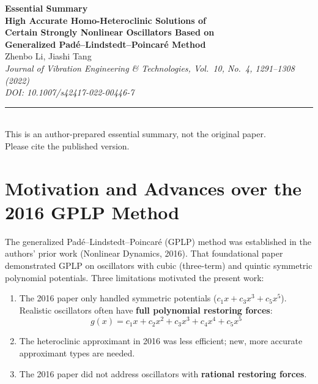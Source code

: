 \documentclass[11pt,a4paper]{article}
\begin{document}
\raggedbottom

\begin{center}
{\LARGE\bfseries\color{primary}Essential Summary}\\[12pt]
{\large\bfseries High Accurate Homo-Heteroclinic Solutions of\\Certain Strongly Nonlinear Oscillators Based on\\Generalized Pad\'e--Lindstedt--Poincar\'e Method}\\[8pt]
{\normalsize Zhenbo Li, Jiashi Tang}\\[4pt]
{\small\itshape Journal of Vibration Engineering \& Technologies, Vol.\ 10, No.\ 4, 1291--1308 (2022)\\[2pt] DOI: 10.1007/s42417-022-00446-7}\\[6pt]
{\small\rule{0.7\textwidth}{0.5pt}}\\[4pt]
{\small\color{accent}This is an author-prepared essential summary, not the original paper.\\Please cite the published version.}
\end{center}\vspace{0.3em}

\section{Motivation and Advances over the 2016 GPLP Method}

The generalized Pad\'e--Lindstedt--Poincar\'e (GPLP) method was established in the authors' prior work (Nonlinear Dynamics, 2016). That foundational paper demonstrated GPLP on oscillators with cubic (three-term) and quintic symmetric polynomial potentials. Three limitations motivated the present work:

\begin{enumerate}[leftmargin=2em]
\item The 2016 paper only handled symmetric potentials ($c_1x + c_3x^3 + c_5x^5$). Realistic oscillators often have \textbf{full polynomial restoring forces}:
\begin{equation}
g(x) = c_1x + c_2x^2 + c_3x^3 + c_4x^4 + c_5x^5
\label{eq:full_quintic}
\end{equation}
\item The heteroclinic approximant in 2016 was less efficient; new, more accurate approximant types are needed.
\item The 2016 paper did not address oscillators with \textbf{rational restoring forces}.
\end{enumerate}
\end{document}
